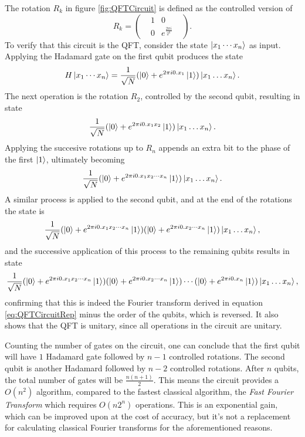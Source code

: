 \documentclass[../../../dissertation.tex]{subfiles}
\begin{document}
\par
The rotation $R_k$ in figure \ref{fig:QFTCircuit} is defined as the controlled version of 
\begin{equation}
	R_k = \begin{pmatrix}
		&1 & 0 & \\
		&0 & e^{\frac{2\pi i}{2^k}}
              \end{pmatrix}.
\end{equation}
To verify that this circuit is the QFT, consider the state $\ket{x_1\cdots x_n}$ as input. Applying the Hadamard gate on the first qubit produces the state
\begin{equation}
	H \ket{x_1 \cdots x_n} = \frac{1}{\sqrt{N}} ( \ket{0} + e^{2\pi i 0.x_1} \ket{1}) \ket{x_1\dots x_n}. 
\end{equation}
The next operation is the rotation $R_2$, controlled by the second qubit, resulting in state
\begin{equation}
	\frac{1}{\sqrt{N}} ( \ket{0} + e^{2\pi i 0.x_1x_2} \ket{1}) \ket{x_1\dots x_n}.
\end{equation}
Applying the succesive rotations up to $R_n$ appends an extra bit to the phase of the first $\ket{1}$, ultimately becoming
\begin{equation}
	\frac{1}{\sqrt{N}} ( \ket{0} + e^{2\pi i 0.x_1x_2\cdots x_n} \ket{1}) \ket{x_1\dots x_n}.
\end{equation}
A similar process is applied to the second qubit, and at the end of the rotations the state is
\begin{equation}
	\frac{1}{\sqrt{N}} ( \ket{0} + e^{2\pi i 0.x_1x_2\cdots x_n} \ket{1})  ( \ket{0} + e^{2\pi i 0.x_2\cdots x_n} \ket{1})\ket{x_1\dots x_n},
\end{equation}
and the successive application of this process to the remaining qubits results in state
\begin{equation}
	\frac{1}{\sqrt{N}} ( \ket{0} + e^{2\pi i 0.x_1x_2\cdots x_n} \ket{1})  ( \ket{0} + e^{2\pi i 0.x_2\cdots x_n} \ket{1})\cdots ( \ket{0} + e^{2\pi i 0.x_n} \ket{1})\ket{x_1\dots x_n},
\end{equation}
confirming that this is indeed the Fourier transform derived in equation \ref{eq:QFTCircuitRep} minus the order of the qubits, which is reversed. It also shows that the QFT is unitary, since all operations in the circuit are unitary.\par
Counting the number of gates on the circuit, one can conclude that the first qubit will have $1$ Hadamard gate followed by $n-1$ controlled rotations. The second qubit is another Hadamard followed by $n-2$ controlled rotations. After $n$ qubits, the total number of gates will be $\frac{n(n+1)}{2}$. This means the circuit provides a $O(n^2)$ algorithm, compared to the fastest classical algorithm, the \textit{Fast Fourier Transform} which requires $O(n2^n)$ operations. This is an exponential gain, which can be improved upon at the cost of accuracy, but it's not a replacement for calculating classical Fourier transforms for the aforementioned reasons. 
\end{document}
